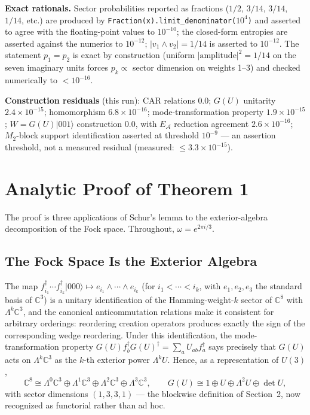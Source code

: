\documentclass[11pt]{article}
\newcommand{\CC}{\mathbb{C}}
\newcommand{\EA}{E_{\mathcal{A}}}
\begin{document}
\textbf{Exact rationals.} Sector probabilities reported as fractions ($1/2$, $3/14$, $3/14$, $1/14$, etc.) are produced by \texttt{Fraction(x).limit\_denominator($10^4$)} and asserted to agree with the floating-point values to $10^{-10}$; the closed-form entropies are asserted against the numerics to $10^{-12}$; $|v_1 \wedge v_2| = 1/14$ is asserted to $10^{-12}$. The statement $p_1 = p_2$ is exact by construction (uniform $|\text{amplitude}|^2 = 1/14$ on the seven imaginary units forces $p_k \propto$ sector dimension on weights 1--3) and checked numerically to $< 10^{-16}$.

\textbf{Construction residuals} (this run): CAR relations $0.0$; $G(U)$ unitarity $2.4 \times 10^{-15}$; homomorphism $6.8 \times 10^{-16}$; mode-transformation property $1.9 \times 10^{-15}$; $W = G(U)|001\rangle$ construction $0.0$, with $\EA$ reduction agreement $2.6 \times 10^{-16}$; $M_2$-block support identification asserted at threshold $10^{-9}$ --- an assertion threshold, not a measured residual (measured: $\leq 3.3 \times 10^{-15}$).

\section{Analytic Proof of Theorem 1}

The proof is three applications of Schur's lemma to the exterior-algebra decomposition of the Fock space. Throughout, $\omega = e^{2\pi i/3}$.

\subsection{The Fock Space Is the Exterior Algebra}

The map $f_{i_1}^\dagger \cdots f_{i_k}^\dagger |000\rangle \mapsto e_{i_1} \wedge \cdots \wedge e_{i_k}$ (for $i_1 < \cdots < i_k$, with $e_1, e_2, e_3$ the standard basis of $\CC^3$) is a unitary identification of the Hamming-weight-$k$ sector of $\CC^8$ with $\Lambda^k \CC^3$, and the canonical anticommutation relations make it consistent for arbitrary orderings: reordering creation operators produces exactly the sign of the corresponding wedge reordering. Under this identification, the mode-transformation property $G(U) f_b^\dagger G(U)^\dagger = \sum_a U_{ab} f_a^\dagger$ says precisely that $G(U)$ acts on $\Lambda^k \CC^3$ as the $k$-th exterior power $\Lambda^k U$. Hence, as a representation of $U(3)$,
\begin{equation}
\CC^8 \cong \Lambda^0 \CC^3 \oplus \Lambda^1 \CC^3 \oplus \Lambda^2 \CC^3 \oplus \Lambda^3 \CC^3, \qquad
G(U) \cong 1 \oplus U \oplus \Lambda^2 U \oplus \det U,
\label{eq:extalg}
\end{equation}
with sector dimensions $(1, 3, 3, 1)$ --- the blockwise definition of Section~2, now recognized as functorial rather than ad hoc.
\end{document}
